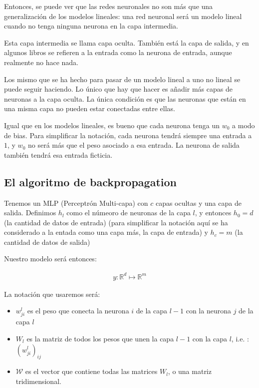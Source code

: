 Entonces, se puede ver que las redes neuronales no son más que una generalización de los modelos lineales: una red neuronal será un modelo lineal cuando no tenga ninguna neurona en la capa intermedia.

Esta capa intermedia se llama capa oculta. También está la capa de salida, y en algunos libros se refieren a la entrada como la neurona de entrada, aunque realmente no hace nada.

Los mismo que se ha hecho para pasar de un modelo lineal a uno no lineal se puede seguir haciendo. Lo único que hay que hacer es añadir más capas de neuronas a la capa oculta. La única condición es que las neuronas que están en una misma capa no pueden estar conectadas entre ellas.

Igual que en los modelos lineales, es bueno que cada neurona tenga un $w_0$ a modo de bias. Para simplificar la notación, cada neurona tendrá siempre una entrada a $1$, y $w_0$ no será más que el peso asociado a esa entrada. La neurona de salida también tendrá esa entrada ficticia.

\subsection{El algoritmo de backpropagation}

Tenemos un MLP (Perceptrón Multi-capa) con $c$ capas ocultas y una capa de salida. Definimos $h_l$ como el númeoro de neuronas de la capa $l$, y entonces $h_0 = d$ (la cantidad de datos de entrada) (para simplificar la notación aquí se ha considerado a la entada como una capa más, la capa de entrada) y $h_c = m$ (la cantidad de datos de salida)

Nuestro modelo será entonces:

\begin{align*}
    y: \mathbb{R}^d \longmapsto \mathbb{R}^m
\end{align*}



La notación que usaremos será:
\begin{itemize}
    \item $w_{ji}^l$ es el peso que conecta la neurona $i$ de la capa $l-1$ con la neurona $j$ de la capa $l$
    \item $W_l$ es la matriz de todos los pesos que unen la capa $l-1$ con la capa $l$, i.e. : $(w_{ji}^l)_{ij}$
    \item $\mathcal{W}$ es el vector que contiene todas las matrices $W_l$, o una matriz tridimensional.
\end{itemize}

